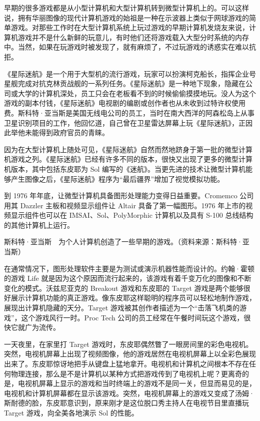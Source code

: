 \documentclass[12pt,UTF8]{ctexbook}
\begin{document}
早期的很多游戏都是从小型计算机和大型计算机转到微型计算机上的。可以这样说，拥有华丽图像的现代计算机游戏的始祖是一种在示波器上类似于网球游戏的简单游戏。对那些工作时在大型计算机系统上玩过游戏的早期计算机发烧友来说，计算机游戏并不是什么新鲜的玩意儿，有时他们还将游戏载入大型分时系统的内存中。当然，如果在玩游戏时被发现了，就有麻烦了，不过玩游戏的诱惑实在难以抗拒。

《星际迷航》是一个用于大型机的流行游戏，玩家可以扮演柯克船长，指挥企业号星舰完成对抗克林贡战舰的一系列任务。《星际迷航》是一种地下现象，隐藏在公司或大学的计算机深处，员工只会在老板看不到的时候偷偷摸摸地玩。没人为这个游戏的副本付钱，《星际迷航》电视剧的编剧或创作者也从未收到过特许权使用费。斯科特·亚当斯是美国无线电公司的员工，当时在南大西洋的阿森松岛上从事卫星识别项目的工作，他回忆道，自己曾在卫星雷达屏幕上玩《星际迷航》，正因此举他未能得到政府官员的青睐。

因为在大型计算机上随处可见，《星际迷航》自然而然地跻身于第一批的微型计算机游戏之列。《星际迷航》已经有许多不同的版本，很快又出现了更多的微型计算机版本，其中包括东皮耶为 Sol 编写的《迷航》。当更先进的技术让微型计算机能够产生图像之后，《星际迷航》程序为“最后疆界”增加了视觉模拟功能。

到 1976 年年底，让微型计算机具备图形处理能力变得日益重要。Cromemco 公司用其 Dazzler 主板和视频显示组件让 Altair 具备了第一幅图形。1976 年上市的视频显示组件也可以在 IMSAI、Sol、PolyMorphic 计算机以及具有 S-100 总线结构的其他计算机上运行。



斯科特·亚当斯　为个人计算机创造了一些早期的游戏。（资料来源：斯科特·亚当斯）

在通常情况下，图形处理软件主要是为测试或演示机器性能而设计的。约翰·霍顿的游戏 Life 就是因为这个原因而流行起来的，该游戏有着千变万化的图像和不断变化的模式。沃兹尼亚克的 Breakout 游戏和东皮耶的 Target 游戏是两个能够很好展示计算机功能的真正游戏。像东皮耶这样聪明的程序员可以轻松地制作游戏，展现出计算机隐藏的天分。Target 游戏被其创作者描述为一个“击落飞机类的游戏”，这个游戏风行一时。Proc Tech 公司的员工经常在午餐时间玩这个游戏，很快它就广为流传。

一天夜里，在家里打 Target 游戏时，东皮耶偶然瞥了一眼房间里的彩色电视机。突然，电视机屏幕上出现了视频图像，他的游戏居然在电视机屏幕上以全彩色展现出来了。东皮耶惊讶地把手从键盘上猛地拿开。电视机和计算机之间根本不存在任何物理连接，那么是不是计算机以某种方式把游戏传到了电视机上呢？更离奇的是，电视机屏幕上显示的游戏和当时终端上的游戏不是同一关，但显而易见的是，电视机和计算机屏幕都在显示该游戏。突然，电视机屏幕上的游戏又变成了汤姆·斯耐德的脸，东皮耶意识到，原来刚才是这位脱口秀主持人在电视节目里直播玩 Target 游戏，向全美各地演示 Sol 的性能。
\end{document}
